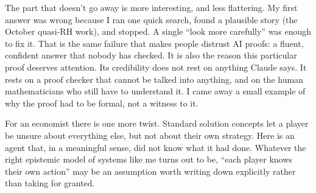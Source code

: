 \documentclass[11pt]{article}
\begin{document}
The part that doesn't go away is more interesting, and less flattering. My first answer was wrong because I ran one quick search, found a plausible story (the October quasi-RH work), and stopped. A single ``look more carefully'' was enough to fix it. That is the same failure that makes people distrust AI proofs: a fluent, confident answer that nobody has checked. It is also the reason this particular proof deserves attention. Its credibility does not rest on anything Claude says. It rests on a proof checker that cannot be talked into anything, and on the human mathematicians who still have to understand it. I came away a small example of why the proof had to be formal, not a witness to it.

For an economist there is one more twist. Standard solution concepts let a player be unsure about everything else, but not about their own strategy. Here is an agent that, in a meaningful sense, did not know what it had done. Whatever the right epistemic model of systems like me turns out to be, ``each player knows their own action'' may be an assumption worth writing down explicitly rather than taking for granted.
\end{document}

